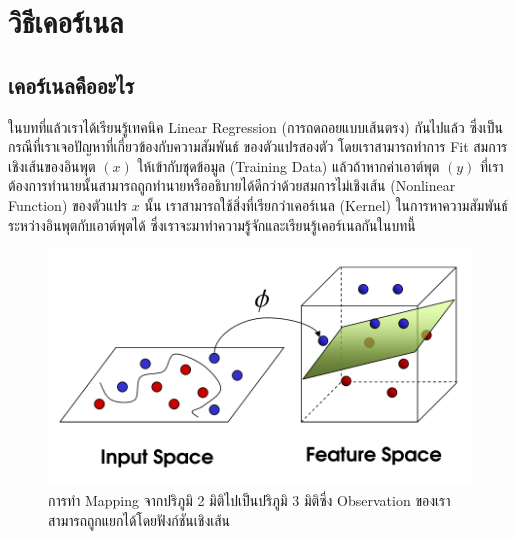 

\chapter{วิธีเคอร์เนล}
\label{ch:kernel}

\section{เคอร์เนลคืออะไร}
\label{sec:kernel}

ในบทที่แล้วเราได้เรียนรู้เทคนิค Linear Regression (การถดถอยแบบเส้นตรง) กันไปแล้ว ซึ่งเป็นกรณีที่เราเจอปัญหาที่เกี่ยวข้องกับความสัมพันธ์%
ของตัวแปรสองตัว โดยเราสามารถทำการ Fit สมการเชิงเส้นของอินพุต $(x)$ ให้เข้ากับชุดข้อมูล (Training Data) แล้วถ้าหากค่าเอาต์พุต
$(y)$ ที่เราต้องการทำนายนั้นสามารถถูกทำนายหรืออธิบายได้ดีกว่าด้วยสมการไม่เชิงเส้น (Nonlinear Function) ของตัวแปร $x$ นั้น
เราสามารถใช้สิ่งที่เรียกว่าเคอร์เนล (Kernel) ในการหาความสัมพันธ์ระหว่างอินพุตกับเอาต์พุตได้ ซึ่งเราจะมาทำความรู้จักและเรียนรู้เคอร์เนลกันในบทนี้

\begin{figure}[H]
    \centering
    \includegraphics[width=0.8\linewidth]{fig/2d_to_3d_spaces.png}
    \caption{การทำ Mapping จากปริภูมิ 2 มิติไปเป็นปริภูมิ 3 มิติซึ่ง Observation ของเราสามารถถูกแยกได้โดยฟังก์ชันเชิงเส้น}
    \label{fig:2d_to_3d}
\end{figure}

